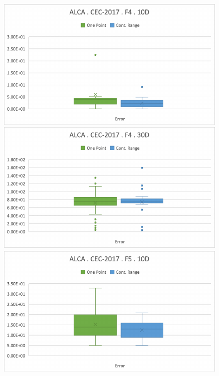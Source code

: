 \documentclass[graybox]{svmult}
\begin{document}
\begin{figure}[!ht]
\begin{minipage}[h]{0.49\linewidth}
        \end{minipage}
        \vfill
        \vspace{0.05 cm}
        \begin{minipage}[h]{0.49\linewidth}
            \includegraphics[width=1\linewidth]{img/fig_experiment_F4x10D.pdf} 
        \end{minipage}
        \hfill
        \begin{minipage}[h]{0.49\linewidth}
            \includegraphics[width=1\linewidth]{img/fig_experiment_F4x30D.pdf} 
        \end{minipage}
        \vfill
        \vspace{0.05 cm}
        \begin{minipage}[h]{0.49\linewidth}
            \includegraphics[width=1\linewidth]{img/fig_experiment_F5x10D.pdf} 

\end{minipage}
\end{figure}
\end{document}
